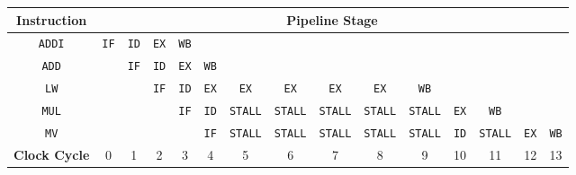 \begin{tabular}{|*{15}{c|}}
	\hline
	\textbf{Instruction} & \multicolumn{14}{c|}{\textbf{Pipeline Stage}} \\
	\hline
	\texttt{ADDI} & \texttt{IF} & \texttt{ID} & \texttt{EX} & \texttt{WB} & & & & & & & & & & 	\\
	\texttt{ADD} & & \texttt{IF} & \texttt{ID} & \texttt{EX} & \texttt{WB} & & & & & & & & & 	\\
	\texttt{LW} & & & \texttt{IF} & \texttt{ID} & \texttt{EX} & \texttt{EX} & \texttt{EX} & \texttt{EX} & \texttt{EX} & \texttt{WB} & & & & \\
	\texttt{MUL} & & & & \texttt{IF} & \texttt{ID} & {\color{red}\texttt{STALL}} & {\color{red}\texttt{STALL}} & {\color{red}\texttt{STALL}} & {\color{red}\texttt{STALL}} & {\color{red}\texttt{STALL}} & \texttt{EX} & \texttt{WB} & & \\
	\texttt{MV} & & & & & \texttt{IF} & {\color{red}\texttt{STALL}} & {\color{red}\texttt{STALL}} & {\color{red}\texttt{STALL}} & {\color{red}\texttt{STALL}} & {\color{red}\texttt{STALL}} & \texttt{ID} & {\color{red}\texttt{STALL}} & \texttt{EX} & \texttt{WB} \\
	\hline
	\hline
	\textbf{Clock Cycle} & 0 & 1 & 2 & 3 & 4 & 5 & 6 & 7 & 8 & 9 & 10 & 11 & 12 & 13 \\ 
	\hline
\end{tabular}